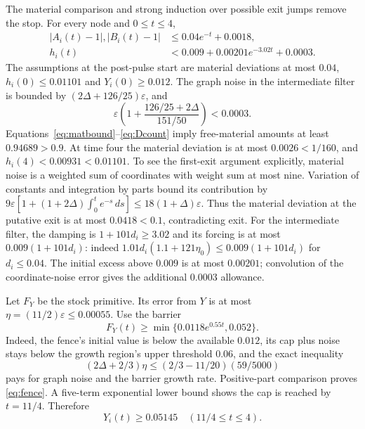 \documentclass[11pt]{article}
\theoremstyle{definition}\newtheorem{definition}[theorem]{Definition}
\begin{document}
The material comparison and strong induction over possible exit jumps remove the stop.
For every node and $0\le t\le4$,
\begin{align}
 |A_i(t)-1|,|B_i(t)-1|&\le0.04e^{-t}+0.0018,\label{eq:matbound}\\
 h_i(t)&<0.009+0.00201e^{-3.02t}+0.0003.\label{eq:Dcount}
\end{align}
The assumptions at the post-pulse start are material deviations at most $0.04$,
$h_i(0)\le0.01101$ and $Y_i(0)\ge0.012$.
The graph noise in the intermediate filter is bounded by
$(2\Delta+126/25)\varepsilon$, and
\begin{equation}
\varepsilon\left(1+\frac{126/25+2\Delta}{151/50}\right)<0.0003.
\end{equation}
Equations~\eqref{eq:matbound}--\eqref{eq:Dcount} imply free-material amounts at least
$0.94689>0.9$. At time four the material deviation is at most $0.0026<1/160$, and
$h_i(4)<0.00931<0.01101$.
To see the first-exit argument explicitly, material noise is a weighted sum
of coordinates with weight sum at most nine. Variation of constants and
integration by parts bound its contribution by
$9\varepsilon[1+(1+2\Delta)\int_0^t e^{-s}\,ds]\le18(1+\Delta)\varepsilon$.
Thus the material deviation at the putative exit is at most $0.0418<0.1$,
contradicting exit. For the intermediate filter, the damping is
$1+101d_i\ge3.02$ and its forcing is at most $0.009(1+101d_i)$:
indeed $1.01d_i(1.1+121\eta_0)\le0.009(1+101d_i)$ for $d_i\le0.04$.
The initial excess above $0.009$ is at most $0.00201$; convolution of the
coordinate-noise error gives the additional $0.0003$ allowance.

Let $F_Y$ be the stock primitive. Its error from $Y$ is at most
$\eta=(11/2)\varepsilon\le0.00055$. Use the barrier
\begin{equation}\label{eq:fence}
F_Y(t)\ge\min\{0.0118e^{0.55t},0.052\}.
\end{equation}
Indeed, the fence's initial value is below the available $0.012$, its cap plus noise stays below
the growth region's upper threshold $0.06$, and the exact inequality
\begin{equation}
(2\Delta+2/3)\eta\le(2/3-11/20)(59/5000)
\end{equation}
pays for graph noise and the barrier growth rate. Positive-part comparison proves
\eqref{eq:fence}. A five-term exponential lower bound shows the cap is reached by
$t=11/4$. Therefore
\begin{equation}\label{eq:stockfloor}
Y_i(t)\ge0.05145\quad(11/4\le t\le4).
\end{equation}
\end{document}
